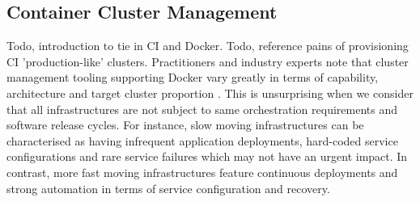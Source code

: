 \documentclass{report}
\begin{document}
\subsection{Container Cluster Management}
Todo, introduction to tie in CI and Docker. Todo, reference pains of provisioning CI 'production-like' clusters. Practitioners and industry experts note that cluster management tooling supporting Docker
vary greatly in terms of capability, architecture and target cluster proportion
\citep{goasguen, holla}. This is unsurprising when we consider that all infrastructures 
are not subject to same orchestration requirements and software release cycles.
For instance, slow moving infrastructures can be characterised as having infrequent application deployments,
 hard-coded service configurations and rare service failures which may not have an urgent impact. In contrast, more fast moving infrastructures feature continuous deployments and strong automation in terms of service configuration and recovery. 
\end{document}
